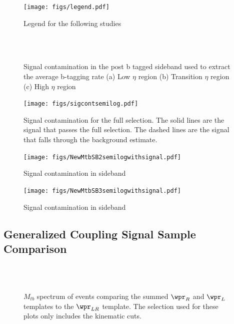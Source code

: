 \begin{figure}[Htcb]
\centering
\texttt{[image: figs/legend.pdf]}
\caption{Legend for the following studies}
\label{figs:legend}
\end{figure}

\begin{figure}[Htcb]
\begin{center}
\\
\\
\caption{
Signal contamination in the post b tagged sideband used to extract the average b-tagging rate
(a) Low $\eta$ region  
(b) Transition $\eta$ region 
(c) High $\eta$ region 
}
\label{figs:trsigcont}
\end{center}
\end{figure}

\begin{figure}[Htcb]
\centering
\texttt{[image: figs/sigcontsemilog.pdf]}
\caption{Signal contamination for the full selection.  The solid lines are the signal that passes the full selection.  The dashed lines are the signal that falls through the background estimate.}
\label{figs:sigFS}
\end{figure}

\begin{figure}[Htcb]
\centering
\texttt{[image: figs/NewMtbSB2semilogwithsignal.pdf]}
\caption{Signal contamination in sideband}
\label{figs:sigSB2}
\end{figure}

\begin{figure}[Htcb]
\centering
\texttt{[image: figs/NewMtbSB3semilogwithsignal.pdf]}
\caption{Signal contamination in sideband}
\label{figs:sigSB3}
\end{figure}


\subsection{Generalized Coupling Signal Sample Comparison}
\label{sec:sigcont}

\begin{figure}[htcb]
\begin{center}
\\
\\
\caption{
$M_{tb}$ spectrum of events comparing the summed $\wpr_{R}$ and $\wpr_{L}$ templates to the $\wpr_{LR}$ template.  The selection used for these plots only includes the kinematic cuts.
}
\label{figs:Gencomp1}
\end{center}
\end{figure}

